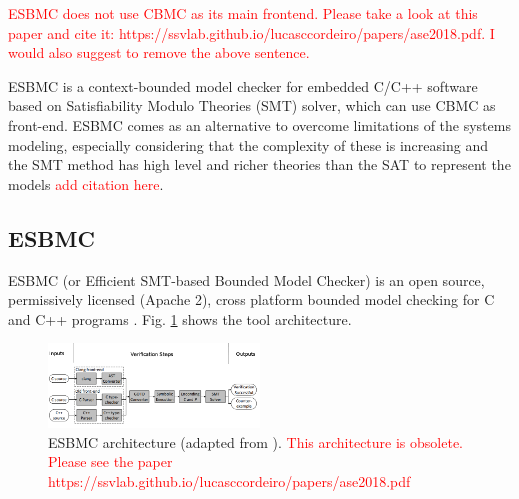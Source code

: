 \documentclass[journal]{IEEEtran}
\begin{document}
\textcolor{red}{ESBMC does not use CBMC as its main frontend. Please take a look at this paper and cite it: https://ssvlab.github.io/lucasccordeiro/papers/ase2018.pdf. I would also suggest to remove the above sentence.}

ESBMC is a context-bounded model checker for embedded C/C++ software based on Satisfiability Modulo Theories (SMT) solver, which can use CBMC as front-end.
ESBMC comes as an alternative to overcome limitations of the systems modeling, especially considering that the complexity of these is increasing and the SMT method has high level and richer theories than the SAT to represent the models \textcolor{red}{add citation here}. 

\subsection{ESBMC }
ESBMC (or Efficient SMT-based Bounded Model Checker) is an open source, permissively licensed (Apache 2), cross platform bounded model checking for C and C++ programs \cite{GadelhaSBMF}. 
Fig. \ref{fig:esbmcarch} shows the tool architecture. 

\begin{figure}[h]
\includegraphics[width=0.5\textwidth]{ESBMCarch2}
\centering
\caption{ESBMC architecture (adapted from \cite{GadelhaSBMF}). \textcolor{red}{This architecture is obsolete. Please see the paper https://ssvlab.github.io/lucasccordeiro/papers/ase2018.pdf}}
\label{fig:esbmcarch}
\end{figure}
\end{document}
